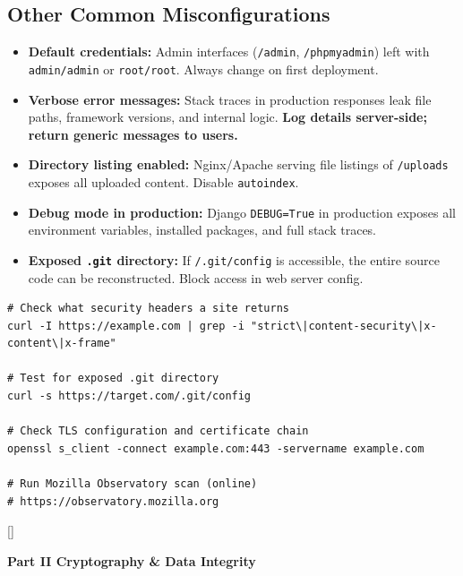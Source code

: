 \documentclass[11pt, letterpaper]{article}
\newcommand{\tealsections}{%
  \titleformat{\section}{\large\bfseries\color{sectionteal}}{}{0em}{}[\color{sectionteal}\titlerule]%
  \titleformat{\subsection}{\normalsize\bfseries\color{sectionteal!80!black}}{}{0em}{}%
}
\newcommand{\partbanner}[3]{%
  \begin{tcolorbox}[colback=#1, colframe=#2, boxrule=1.2pt, arc=4pt,
    left=8pt, right=8pt, top=6pt, bottom=6pt]
    \begin{center}{\LARGE\bfseries #3}\end{center}
  \end{tcolorbox}%
}
\begin{document}
\subsection*{Other Common Misconfigurations}

\begin{itemize}[noitemsep]
  \item \textbf{Default credentials:} Admin interfaces (\texttt{/admin}, \texttt{/phpmyadmin}) left with \texttt{admin/admin} or \texttt{root/root}. Always change on first deployment.
  \item \textbf{Verbose error messages:} Stack traces in production responses leak file paths, framework versions, and internal logic. \textbf{Log details server-side; return generic messages to users.}
  \item \textbf{Directory listing enabled:} Nginx/Apache serving file listings of \texttt{/uploads} exposes all uploaded content. Disable \texttt{autoindex}.
  \item \textbf{Debug mode in production:} Django \texttt{DEBUG=True} in production exposes all environment variables, installed packages, and full stack traces.
  \item \textbf{Exposed \texttt{.git} directory:} If \texttt{/.git/config} is accessible, the entire source code can be reconstructed. Block access in web server config.
\end{itemize}

\begin{lstlisting}[style=shell, caption={Check headers and misconfigurations from the command line}]
# Check what security headers a site returns
curl -I https://example.com | grep -i "strict\|content-security\|x-content\|x-frame"

# Test for exposed .git directory
curl -s https://target.com/.git/config

# Check TLS configuration and certificate chain
openssl s_client -connect example.com:443 -servername example.com

# Run Mozilla Observatory scan (online)
# https://observatory.mozilla.org
\end{lstlisting}

\newpage

\tealsections
{}
\partbanner{part5bg}{sectionteal}{Part II \quad Cryptography \& Data Integrity}
\end{document}
